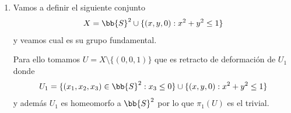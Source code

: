 \begin{ejemplo}
\begin{enumerate}
\begin{figure}[H]
        \end{figure}

        Para ello, con una simple inducción se puede demostrar que esto es cierto para una cantidad finita de esferas usando el ejemplo anterior. En este caso tenemos una cantidad infinita de esferas pero como un lazo es un compacto en $\bb{R}^3$, tiene que caer en una unión finita de esferas (unidas dos a dos por un único punto) por lo que se podrá reducir al trivial.


        \item Vamos a definir el siguiente conjunto
        \begin{gather*}
            X = \bb{S}^2 \cup \{(x,y,0) : x^2 + y^2 \leq 1\}
        \end{gather*}
        y veamos cual es su grupo fundamental.

        \begin{figure}[H]
            \centering
        \end{figure}

        Para ello tomamos $U=X\setminus \{(0,0,1)\}$ que es retracto de deformación de $U_1$ donde
        \begin{gather*}
            U_1 = \{(x_1,x_2,x_3)\in \bb{S}^2 : x_3 \leq 0\}\cup \{(x,y,0) : x^2 + y^2 \leq 1\}
        \end{gather*}
        y además $U_1$ es homeomorfo a $\bb{S}^2$ por lo que $\pi_1(U)$ es el trivial. 
        
        \begin{figure}[H]
            \centering
\end{figure}
\end{enumerate}
\end{ejemplo}
